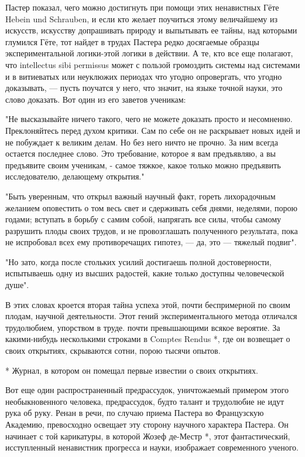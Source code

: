 Пастер показал, чего можно достигнуть  при помощи этих ненавистных  Гёте
Hebein und Schrauben, и если  кто желает поучиться этому величайшему  из
искусств, искусству  допрашивать  природу  и выпытывать  ее  тайны,  над
которыми глумился Гёте,  тот найдет  в трудах  Пастера редко  досягаемые
образцы экспериментальной логики-этой логики в  действии. А те, кто  все
еще полагают, что intellectus sibi permissus может с пользой  громоздить
системы над системами и в  витиеватых или неуклюжих периодах что  угодно
опровергать, что угодно доказывать, --- пусть поучатся у него, что значит,
на языке  точной науки,  это слово  доказать. Вот  один из  его  заветов
ученикам:

"Не высказывайте ничего такого, чего не можете доказать просто и
несомненно. Преклоняйтесь перед духом критики. Сам по себе он не
раскрывает новых идей и не побуждает к великим делам. Но без него
ничто не прочно. За ним всегда остается последнее слово. Это
требование, которое я вам предъявляю, а вы предъявите своим ученикам,
- самое тяжкое, какое только можно предъявить исследователю, делающему
открытия."

"Быть уверенным, что открыл важный научный факт, гореть лихорадочным
желанием оповестить о том весь свет и сдерживать себя днями, неделями,
порою годами; вступать в борьбу с самим собой, напрягать все силы,
чтобы самому разрушить плоды своих трудов, и не провозглашать
полученного результата, пока не испробовал всех ему противоречащих
гипотез, --- да, это --- тяжелый подвиг".

"Но зато, когда после стольких усилий достигаешь полной достоверности,
испытываешь одну из высших радостей, какие только доступны
человеческой душе".

В этих словах кроется  вторая тайна успеха  этой, почти беспримерной  по
своим плодам, научной деятельности. Этот гений экспериментального метода
отличался трудолюбием,  упорством  в труде.  почти  превышающими  всякое
вероятие. За какими-нибудь несколькими строками в Comptes Rendus *,  где
он возвещает о своих открытиях, скрываются сотни, порою тысячи опытов.

* Журнал, в котором он помещал первые известии о своих открытиях.

Вот еще один распространенный предрассудок, уничтожаемый примером  этого
необыкновенного человека,  предрассудок,  будто талант  и трудолюбие  не
идут рука об руку. Ренан в речи, по случаю приема Пастера во Французскую
Академию, превосходно освещает эту  сторону научного характера  Пастера.
Он  начинает  с  той  карикатуры,  в  которой  Жозеф  де-Местр  *,  этот
фантастический, исступленный ненавистник  прогресса и науки,  изображает
современного ученого.

